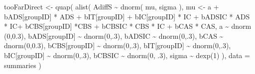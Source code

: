 \documentclass[
  10pt,
  dvipsnames,enabledeprecatedfontcommands]{scrartcl}
\newenvironment{Shaded}{\begin{snugshade}}{\end{snugshade}}
\newcommand{\AttributeTok}[1]{\textcolor[rgb]{0.77,0.63,0.00}{#1}}
\newcommand{\DecValTok}[1]{\textcolor[rgb]{0.00,0.00,0.81}{#1}}
\newcommand{\FloatTok}[1]{\textcolor[rgb]{0.00,0.00,0.81}{#1}}
\newcommand{\FunctionTok}[1]{\textcolor[rgb]{0.00,0.00,0.00}{#1}}
\newcommand{\NormalTok}[1]{#1}
\newcommand{\OtherTok}[1]{\textcolor[rgb]{0.56,0.35,0.01}{#1}}
\newcommand{\SpecialCharTok}[1]{\textcolor[rgb]{0.00,0.00,0.00}{#1}}
\begin{document}
\begin{Shaded}
\begin{Highlighting}[]
\NormalTok{tooFarDirect }\OtherTok{\textless{}{-}} \FunctionTok{quap}\NormalTok{(}
  \FunctionTok{alist}\NormalTok{(}
\NormalTok{    AdiffS }\SpecialCharTok{\textasciitilde{}} \FunctionTok{dnorm}\NormalTok{( mu, sigma ),}
\NormalTok{    mu }\OtherTok{\textless{}{-}}\NormalTok{ a }\SpecialCharTok{+}\NormalTok{ bADS[groupID] }\SpecialCharTok{*}\NormalTok{ ADS }\SpecialCharTok{+}\NormalTok{  bIT[groupID] }\SpecialCharTok{+}\NormalTok{ bIC[groupID] }\SpecialCharTok{*}\NormalTok{ IC }\SpecialCharTok{+} 
\NormalTok{      bADSIC }\SpecialCharTok{*}\NormalTok{ ADS }\SpecialCharTok{*}\NormalTok{ IC}\SpecialCharTok{+}\NormalTok{ bCBS[groupID] }\SpecialCharTok{*}\NormalTok{CBS }\SpecialCharTok{+}\NormalTok{ bCBSIC }\SpecialCharTok{*}\NormalTok{ CBS }\SpecialCharTok{*}\NormalTok{ IC }\SpecialCharTok{+}\NormalTok{ bCAS }\SpecialCharTok{*}\NormalTok{ CAS, }
\NormalTok{    a }\SpecialCharTok{\textasciitilde{}} \FunctionTok{dnorm}\NormalTok{ (}\DecValTok{0}\NormalTok{,}\FloatTok{0.3}\NormalTok{),}
\NormalTok{    bADS[groupID] }\SpecialCharTok{\textasciitilde{}} \FunctionTok{dnorm}\NormalTok{(}\DecValTok{0}\NormalTok{,.}\DecValTok{3}\NormalTok{),}
\NormalTok{    bADSIC }\SpecialCharTok{\textasciitilde{}} \FunctionTok{dnorm}\NormalTok{(}\DecValTok{0}\NormalTok{,.}\DecValTok{3}\NormalTok{),}
\NormalTok{    bCAS }\SpecialCharTok{\textasciitilde{}} \FunctionTok{dnorm}\NormalTok{(}\DecValTok{0}\NormalTok{,}\FloatTok{0.3}\NormalTok{),}
\NormalTok{    bCBS[groupID] }\SpecialCharTok{\textasciitilde{}} \FunctionTok{dnorm}\NormalTok{(}\DecValTok{0}\NormalTok{,.}\DecValTok{3}\NormalTok{),}
\NormalTok{    bIT[groupID] }\SpecialCharTok{\textasciitilde{}} \FunctionTok{dnorm}\NormalTok{(}\DecValTok{0}\NormalTok{,.}\DecValTok{3}\NormalTok{),}
\NormalTok{    bIC[groupID] }\SpecialCharTok{\textasciitilde{}} \FunctionTok{dnorm}\NormalTok{(}\DecValTok{0}\NormalTok{,.}\DecValTok{3}\NormalTok{),}
\NormalTok{    bCBSIC }\SpecialCharTok{\textasciitilde{}} \FunctionTok{dnorm}\NormalTok{(}\DecValTok{0}\NormalTok{, .}\DecValTok{3}\NormalTok{),}
\NormalTok{    sigma  }\SpecialCharTok{\textasciitilde{}} \FunctionTok{dexp}\NormalTok{(}\DecValTok{1}\NormalTok{)}
\NormalTok{  ), }
  \AttributeTok{data =}\NormalTok{ summaries}
\NormalTok{)}





\end{Highlighting}
\end{Shaded}
\end{document}
